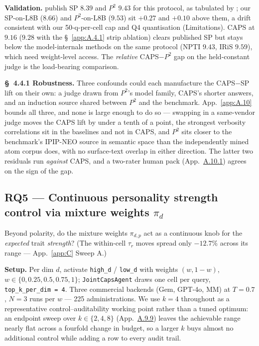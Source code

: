\textbf{Validation.} \citet{NPTI} publish SP $8.39$ and $P^{\!2}$ $9.43$ for this protocol, as tabulated by \citet{IRiS}; our SP-on-L8B ($8.66$) and $P^{\!2}$-on-L8B ($9.53$) sit $+0.27$ and $+0.10$ above them, a drift consistent with our 50-q-per-cell cap and Q4 quantisation (Limitations). CAPS at $9.16$ ($9.28$ with the \S~\ref{app:A.4.1} strip ablation) clears published SP but stays below the model-internals methods on the same protocol (NPTI $9.43$, IRiS $9.59$), which need weight-level access. The \textit{relative} CAPS$-$$P^{\!2}$ gap on the held-constant judge is the load-bearing comparison.

\label{sec:4.4.1}
\textbf{\S~4.4.1 Robustness.} Three confounds could each manufacture the CAPS$-$SP lift on their own: a judge drawn from $P^{\!2}$'s model family, CAPS's shorter answers, and an induction source shared between $P^{\!2}$ and the benchmark. App.~\ref{app:A.10} bounds all three, and none is large enough to do so --- swapping in a same-vendor judge moves the CAPS lift by under a tenth of a point, the strongest verbosity correlations sit in the baselines and not in CAPS, and $P^{\!2}$ sits closer to the benchmark's IPIP-NEO source in semantic space than the independently mined atom corpus does, with no surface-text overlap in either direction. The latter two residuals run \textit{against} CAPS, and a two-rater human pack (App.~\hyperref[app:A.10.1]{A.10.1}) agrees on the sign of the gap.

\subsection{RQ5 --- Continuous personality strength control via mixture weights $\pi_d$}
\label{sec:4.5}

Beyond polarity, do the mixture weights $\pi_{d,p}$ act as a continuous knob for the \textit{expected} trait \textit{strength}? (The within-cell $\tau_r$ moves spread only $-12.7\%$ across its range --- App.~\ref{app:C} Sweep A.)

\textbf{Setup.} Per dim $d$, activate \texttt{high\_\allowbreak{}d} / \texttt{low\_\allowbreak{}d} with weights $(w, 1-w)$, $w \in \{0, 0.25, 0.5, 0.75, 1\}$; \texttt{JointCapsAgent} draws one cell per query, \texttt{top\_\allowbreak{}k\_\allowbreak{}per\_\allowbreak{}dim = 4}. Three commercial backends (Gem, GPT-4o, MM) at $T = 0.7$, $N = 3$ runs per $w$ --- 225 administrations. We use $k = 4$ throughout as a representative control--auditability working point rather than a tuned optimum: an endpoint sweep over $k \in \{2, 4, 8\}$ (App.~\hyperref[app:A.9.9]{A.9.9}) leaves the achievable range nearly flat across a fourfold change in budget, so a larger $k$ buys almost no additional control while adding a row to every audit trail.

